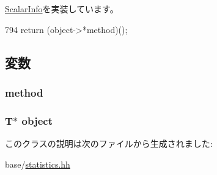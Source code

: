 \hyperlink{classStats_1_1ScalarInfo_a1fb831559ad900460c4c9e4f546cd234}{ScalarInfo}を実装しています。


\begin{DoxyCode}
794 { return (object->*method)(); }
\end{DoxyCode}


\subsection{変数}
\hypertarget{classStats_1_1MethodProxy_a0c507c9bd3c94c998cf9948b6743434c}{
\subsubsection[{method}]{ {\bf method}}}
\label{classStats_1_1MethodProxy_a0c507c9bd3c94c998cf9948b6743434c}
\hypertarget{classStats_1_1MethodProxy_acd5a12b9b1a75e37fd605accfe038a03}{
\subsubsection[{object}]{\setlength{\rightskip}{0pt plus 5cm}T$\ast$ {\bf object}}}
\label{classStats_1_1MethodProxy_acd5a12b9b1a75e37fd605accfe038a03}


このクラスの説明は次のファイルから生成されました:\begin{DoxyCompactItemize}
\item 
base/\hyperlink{statistics_8hh}{statistics.hh}\end{DoxyCompactItemize}
